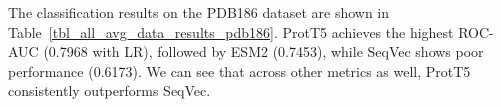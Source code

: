 \documentclass[]{Liebert_Author_revised}
\begin{document}
The classification results on the PDB186 dataset are shown in Table~\ref{tbl_all_avg_data_results_pdb186}. ProtT5 achieves the highest ROC-AUC (0.7968 with LR), followed by ESM2 (0.7453), while SeqVec shows poor performance (0.6173). We can see that across other metrics as well, ProtT5 consistently outperforms SeqVec.
\end{document}
